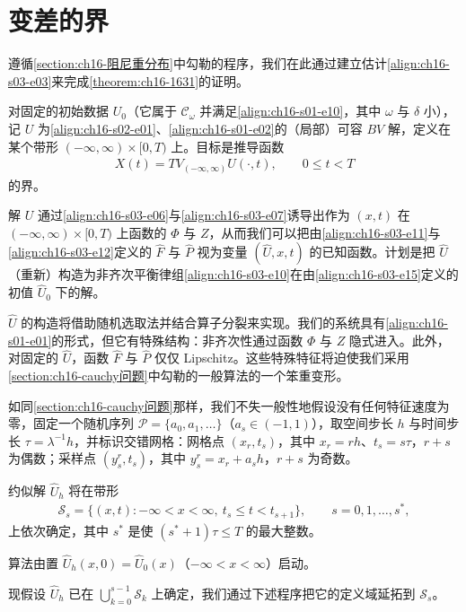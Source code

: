 ﻿\documentclass[../../main.tex]{subfiles}
\begin{document}
\section{变差的界}\label{section:ch16-变差界}

遵循\cref{section:ch16-阻尼重分布}中勾勒的程序，我们在此通过建立估计\eqref{align:ch16-s03-e03}来完成\cref{theorem:ch16-1631}的证明。

对固定的初始数据 $U_0$（它属于 $\mathscr{C}_\omega$ 并满足\eqref{align:ch16-s01-e10}，其中 $\omega$ 与 $\delta$ 小），记 $U$ 为\eqref{align:ch16-s02-e01}、\eqref{align:ch16-s01-e02}的（局部）可容 $BV$ 解，定义在某个带形 $(-\infty,\infty)\times[0,T)$ 上。目标是推导函数
\begin{align}
X(t)=TV_{(-\infty,\infty)}U(\cdot,t),\qquad 0\leqslant t<T
\label{align:ch16-s04-e01}
\end{align}
的界。

解 $U$ 通过\eqref{align:ch16-s03-e06}与\eqref{align:ch16-s03-e07}诱导出作为 $(x,t)$ 在 $(-\infty,\infty)\times[0,T)$ 上函数的 $\Phi$ 与 $Z$，从而我们可以把由\eqref{align:ch16-s03-e11}与\eqref{align:ch16-s03-e12}定义的 $\hat F$ 与 $\hat P$ 视为变量 $(\hat U,x,t)$ 的已知函数。计划是把 $\hat U$（重新）构造为非齐次平衡律组\eqref{align:ch16-s03-e10}在由\eqref{align:ch16-s03-e15}定义的初值 $\hat U_0$ 下的解。

$\hat U$ 的构造将借助随机选取法并结合算子分裂来实现。我们的系统具有\eqref{align:ch16-s01-e01}的形式，但它有特殊结构：非齐次性通过函数 $\Phi$ 与 $Z$ 隐式进入。此外，对固定的 $\hat U$，函数 $\hat F$ 与 $\hat P$ 仅仅 Lipschitz。这些特殊特征将迫使我们采用\cref{section:ch16-cauchy问题}中勾勒的一般算法的一个笨重变形。

如同\cref{section:ch16-cauchy问题}那样，我们不失一般性地假设没有任何特征速度为零，固定一个随机序列 $\mathscr{P}=\{a_0,a_1,\ldots\}$（$a_s\in(-1,1)$），取空间步长 $h$ 与时间步长 $\tau=\lambda^{-1}h$，并标识交错网格：网格点 $(x_r,t_s)$，其中 $x_r=rh$、$t_s=s\tau$，$r+s$ 为偶数；采样点 $(y_s^r,t_s)$，其中 $y_s^r=x_r+a_sh$，$r+s$ 为奇数。

约似解 $\hat U_h$ 将在带形
\begin{align}
\mathscr{S}_s=\{(x,t):-\infty<x<\infty,\ t_s\leqslant t<t_{s+1}\},\qquad s=0,1,\ldots,s^*,
\label{align:ch16-s04-e02}
\end{align}
上依次确定，其中 $s^*$ 是使 $(s^*+1)\tau\leqslant T$ 的最大整数。

算法由置 $\hat U_h(x,0)=\hat U_0(x)$（$-\infty<x<\infty$）启动。

现假设 $\hat U_h$ 已在 $\bigcup_{k=0}^{s-1}\mathscr{S}_k$ 上确定，我们通过下述程序把它的定义域延拓到 $\mathscr{S}_s$。
\end{document}
